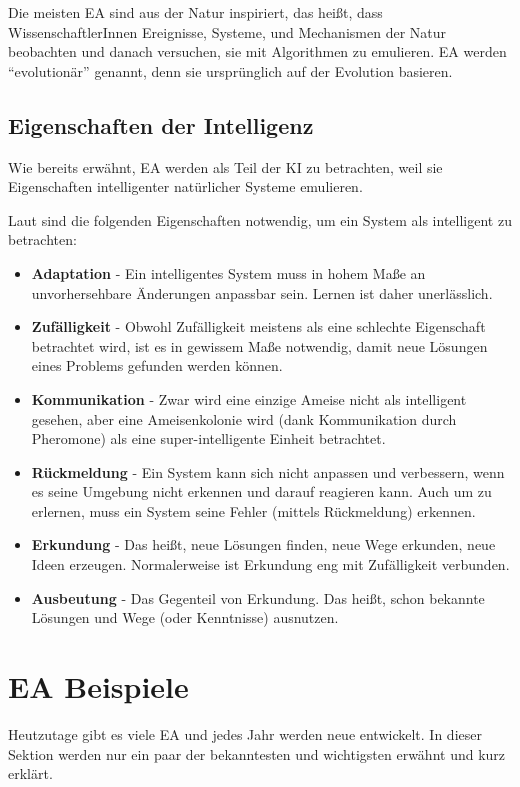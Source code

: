 \documentclass[twoside,twocolumn]{article}
\begin{document}
Die meisten EA sind aus der Natur inspiriert, das heißt, dass WissenschaftlerInnen Ereignisse, Systeme, und Mechanismen der Natur beobachten und danach versuchen, sie mit Algorithmen zu emulieren. EA werden \enquote{evolutionär} genannt, denn sie ursprünglich auf der Evolution basieren. \cite{holland_ga}

\subsection{Eigenschaften der Intelligenz}
Wie bereits erwähnt, EA werden als Teil der KI zu betrachten, weil sie Eigenschaften intelligenter natürlicher Systeme emulieren.\par
Laut \cite[Kapitel 2.7]{wiley_evolutionary} sind die folgenden Eigenschaften notwendig, um ein System als intelligent zu betrachten:

\begin{itemize}
\item{\textbf{Adaptation} - Ein intelligentes System muss in hohem Maße an unvorhersehbare Änderungen anpassbar sein. Lernen ist daher unerlässlich.}
\item{\textbf{Zufälligkeit} - Obwohl Zufälligkeit meistens als eine schlechte Eigenschaft betrachtet wird, ist es in gewissem Maße notwendig, damit neue Lösungen eines Problems gefunden werden können.}
\item{\textbf{Kommunikation} -  Zwar wird eine einzige Ameise nicht als intelligent gesehen, aber eine Ameisenkolonie wird (dank Kommunikation durch Pheromone) als eine super-intelligente Einheit betrachtet.}
\item{\textbf{Rückmeldung} - Ein System kann sich nicht anpassen und verbessern, wenn es seine Umgebung nicht erkennen und darauf reagieren kann. Auch um zu erlernen, muss ein System seine Fehler (mittels Rückmeldung) erkennen.}
\item{\textbf{Erkundung} - Das heißt, neue Lösungen finden, neue Wege erkunden, neue Ideen erzeugen. Normalerweise ist Erkundung eng mit Zufälligkeit verbunden.}
\item{\textbf{Ausbeutung} - Das Gegenteil von Erkundung. Das heißt, schon bekannte Lösungen und Wege (oder Kenntnisse) ausnutzen.}
\end{itemize}


\section{EA Beispiele}
Heutzutage gibt es viele EA und jedes Jahr werden neue entwickelt. In dieser Sektion werden nur ein paar der bekanntesten und wichtigsten erwähnt und kurz erklärt.
\end{document}
